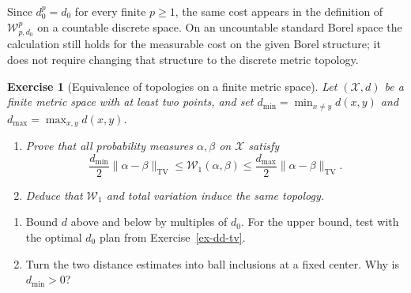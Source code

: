 \documentclass[11pt,a4paper]{article}
\theoremstyle{exostyle}
\newtheorem{exercise}{Exercise}
\newif\ifcorr
\newcommand{\Wone}{\mathcal{W}_1}
\newcommand{\X}{\mathcal X}
\begin{document}
\begin{solution}
Since $d_0^p=d_0$ for every finite $p\ge 1$, the same cost appears in
the definition of $\mathcal W_{p,d_0}^p$ on a countable discrete space.
On an uncountable standard Borel space the calculation still holds
for the measurable cost on the given Borel structure; it does not
require changing that structure to the discrete metric topology.
\end{solution}

\begin{exercise}[Equivalence of topologies on a finite metric space]\label{ex-dd-finite}
Let $(\X,d)$ be a finite metric space with at least two points, and set
$d_{\min}=\min_{x\ne y}d(x,y)$ and $d_{\max}=\max_{x,y}d(x,y)$.
\begin{enumerate}[label=(\alph*)]
\item Prove that all probability measures $\alpha,\beta$ on $\X$ satisfy
  \[
    \frac{d_{\min}}2\|\alpha-\beta\|_{\mathrm{TV}}
    \le \Wone(\alpha,\beta)
    \le\frac{d_{\max}}2\|\alpha-\beta\|_{\mathrm{TV}} .
  \]
\item Deduce that $\Wone$ and total variation induce the same topology.
\end{enumerate}
\end{exercise}
\begin{hints}
\begin{enumerate}[label=(\alph*)]
\item Bound $d$ above and below by multiples of $d_0$. For the upper
  bound, test with the optimal $d_0$ plan from Exercise~\ref{ex-dd-tv}.
\item Turn the two distance estimates into ball inclusions at a fixed
  center. Why is $d_{\min}>0$?
\end{enumerate}
\end{hints}
\ifcorr\Needspace{12\baselineskip}\fi
\end{document}
